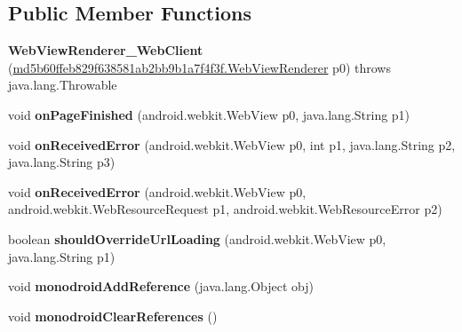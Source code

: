 \subsection*{Public Member Functions}
\begin{DoxyCompactItemize}
\item 
\mbox{\label{classmd5b60ffeb829f638581ab2bb9b1a7f4f3f_1_1_web_view_renderer___web_client_a33a9cb674329cd918c4039658a2f3d84}} 
{\bfseries Web\+View\+Renderer\+\_\+\+Web\+Client} (\hyperlink{classmd5b60ffeb829f638581ab2bb9b1a7f4f3f_1_1_web_view_renderer}{md5b60ffeb829f638581ab2bb9b1a7f4f3f.\+Web\+View\+Renderer} p0)  throws java.\+lang.\+Throwable 	
\item 
\mbox{\label{classmd5b60ffeb829f638581ab2bb9b1a7f4f3f_1_1_web_view_renderer___web_client_ab063610e154fb263a1a28d889d535cfe}} 
void {\bfseries on\+Page\+Finished} (android.\+webkit.\+Web\+View p0, java.\+lang.\+String p1)
\item 
\mbox{\label{classmd5b60ffeb829f638581ab2bb9b1a7f4f3f_1_1_web_view_renderer___web_client_a3e92fd41a7e068430df1b5280e3e138a}} 
void {\bfseries on\+Received\+Error} (android.\+webkit.\+Web\+View p0, int p1, java.\+lang.\+String p2, java.\+lang.\+String p3)
\item 
\mbox{\label{classmd5b60ffeb829f638581ab2bb9b1a7f4f3f_1_1_web_view_renderer___web_client_a62578f73914345150ae2e2dd574e703b}} 
void {\bfseries on\+Received\+Error} (android.\+webkit.\+Web\+View p0, android.\+webkit.\+Web\+Resource\+Request p1, android.\+webkit.\+Web\+Resource\+Error p2)
\item 
\mbox{\label{classmd5b60ffeb829f638581ab2bb9b1a7f4f3f_1_1_web_view_renderer___web_client_a56f79eb769429d223e2db82caeaa506e}} 
boolean {\bfseries should\+Override\+Url\+Loading} (android.\+webkit.\+Web\+View p0, java.\+lang.\+String p1)
\item 
\mbox{\label{classmd5b60ffeb829f638581ab2bb9b1a7f4f3f_1_1_web_view_renderer___web_client_a3143e24d6cac64ffe8d112f95fea6ebb}} 
void {\bfseries monodroid\+Add\+Reference} (java.\+lang.\+Object obj)
\item 
\mbox{\label{classmd5b60ffeb829f638581ab2bb9b1a7f4f3f_1_1_web_view_renderer___web_client_a75eb82e6db7f723093a7ea63eda54cd2}} 
void {\bfseries monodroid\+Clear\+References} ()
\end{DoxyCompactItemize}
